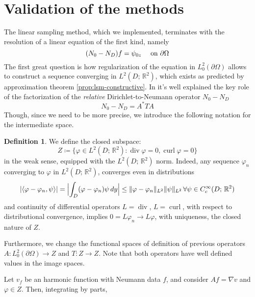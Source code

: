 \documentclass[10pt, a4paper, twoside, openright]{book}
\theoremstyle{definition}
\newtheorem{definition}[subsection]{Definition}
\theoremstyle{plain}
\theoremstyle{plain}
\theoremstyle{plain}
\theoremstyle{plain}
\theoremstyle{plain}
\theoremstyle{plain}
\theoremstyle{plain}
\theoremstyle{plain}
\DeclareMathOperator{\divergence}{div}
\DeclareMathOperator{\curl}{curl}
\let\phi\varphi
\begin{document}
\section{Validation of the methods}
\label{section:validation}
The linear sampling method, which we implemented, terminates with the resolution of a linear equation of the first kind, namely
\begin{equation}
\label{eq:NtoD_firstkind}
 ({N_0} - {N_D}) f = \psi_{0z}\quad \textup{ on }\partial \Omega
\end{equation}
The first great question is how regularization of the equation in $L^2_0(\partial \Omega)$
allows to construct a sequence converging in $L^2(D;\,\mathbb{R}^2)$, which exists as predicted by approximation theorem \ref{prop:lsm-constructive}.
In \cite{arens:why} it's well explained the key role of the factorization 
of the \textit{relative} Dirichlet-to-Neumann operator ${N_0} - {N_D}$
\begin{equation}
 {N_0} - {N_D} = A^*TA
\end{equation}
Though, since we need to be more precise, we introduce the following notation for the intermediate space.
\begin{definition}
We define the closed subspace:
\begin{equation}
 Z\coloneqq\bigl\{\phi\in L^2(D;\,\mathbb{R}^2):\divergence\phi=0, \curl\phi=0\bigr\}
\end{equation}
in the weak sense, equipped with the $L^2(D;\,\mathbb{R}^2)$ norm. Indeed, any sequence $\phi_n$ converging to $\phi$ in $L^2(D;\,\mathbb{R}^2)$, converges even in distributions
\begin{equation}
 |\langle\phi-\phi_n, \psi\rangle|=\Bigl|\int_D(\phi-\phi_n)\psi\,dy\Bigr|\leq\|\phi - \phi_n\|_{L^2}\|\psi\|_{L^2}\, \forall\psi\in C^\infty_c(D;\,\mathbb{R}^2)
\end{equation}
and continuity of differential operators $L=\divergence$, $L=\curl$, with respect to distributional convergence, implies $0=L\phi_n\to L\phi$, with uniqueness, the closed nature of $Z$.
\par 
Furthermore, we change the functional spaces of definition of previous operators $A:L^2_0(\partial \Omega)\to Z$ and $T:Z \to Z$. 
Note that both operators have well defined values in the image spaces.
\end{definition}
Let $v_f$ be an harmonic function with Neumann data $f$, and consider $Af=\nabla v$ and $\phi\in Z$. Then, integrating by parts,
\end{document}
